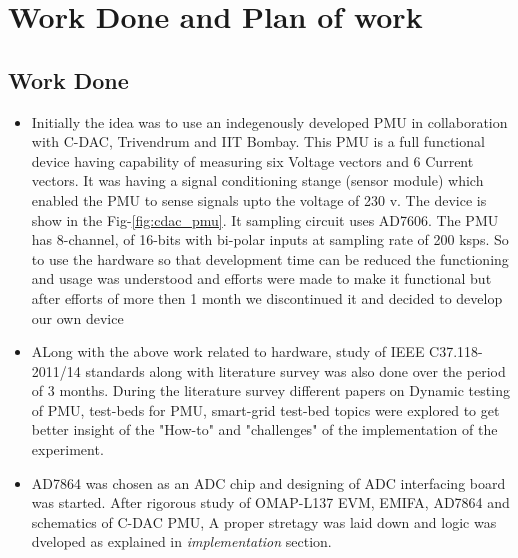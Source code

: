 
\section{Work Done and Plan of work}
\subsection*{Work Done}


\begin{itemize}
\item Initially the idea was to use an indegenously developed PMU in collaboration with C-DAC, Trivendrum and IIT Bombay. This PMU is a full functional device having capability of measuring six Voltage vectors and 6 Current vectors. It was having a signal conditioning stange (sensor module) which enabled the PMU to sense signals upto the voltage of 230 v. The device is show in the Fig-\ref{fig:cdac_pmu}. It sampling circuit uses AD7606. The PMU has 8-channel, of 16-bits with bi-polar inputs at sampling rate of 200 ksps. So to use the hardware so that development time can be reduced the functioning and usage was understood and efforts were made to make it functional but after efforts of more then 1 month we discontinued it and decided to develop our own device

\item ALong with the above work related to hardware, study of IEEE C37.118-2011/14 standards along with literature survey was also done over the period of 3 months. During the literature survey different papers on Dynamic testing of PMU, test-beds for PMU, smart-grid test-bed topics were explored to get better insight of the "How-to" and "challenges" of the implementation of the experiment.

\item AD7864 was chosen as an ADC chip and designing of ADC interfacing board was started. After rigorous study of OMAP-L137 EVM, EMIFA, AD7864 and schematics of C-DAC PMU, A proper stretagy was laid down and logic was dveloped as explained in \textit{implementation} section.   
\end{itemize}

